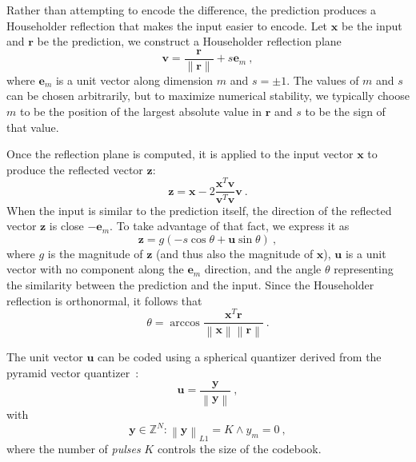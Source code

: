 \documentclass[english,conference,10pt]{IEEEtran}
\begin{document}
Rather than attempting to encode the difference, the prediction produces
a Householder reflection that makes the input easier to encode. Let 
$\mathbf{x}$ be the input and $\mathbf{r}$ be the prediction, we construct
 a Householder reflection plane
\begin{equation}
\mathbf{v} = \frac{\mathbf{r}}{\|\mathbf{r}\|} + s\mathbf{e}_m\ ,
\end{equation}
where $\mathbf{e}_m$ is a unit vector along dimension $m$ and $s = \pm1$.
The values of $m$ and $s$ can be chosen arbitrarily, but to maximize
numerical stability, we typically choose $m$ to be the position of the
largest absolute value in $\mathbf{r}$ and $s$ to be the sign of that value.

Once the reflection plane is computed, it is applied to the input vector
$\mathbf{x}$ to produce the reflected vector $\mathbf{z}$:
\begin{equation}
\mathbf{z} = \mathbf{x} - 2\frac{\mathbf{x}^T\mathbf{v}}
{\mathbf{v}^T\mathbf{v}}\mathbf{v}\ .
\end{equation}
When the input is similar to the prediction itself, the direction of the
reflected vector $\mathbf{z}$ is close $-\mathbf{e}_m$. To take advantage of
that fact, we express it as
\begin{equation}
\mathbf{z} = g\left(-s\cos\theta + \mathbf{u}\sin\theta\right)\ ,
\end{equation}
where $g$ is the magnitude of $\mathbf{z}$ (and thus also the magnitude of
$\mathbf{x}$), $\mathbf{u}$ is a unit vector with no component along the
$\mathbf{e}_m$ direction, and the angle $\theta$ representing the
similarity between the prediction and the input. Since the Householder
reflection is orthonormal, it follows that
\begin{equation}
\theta = \arccos\frac{\mathbf{x}^T\mathbf{r}}
                   {\left\|\mathbf{x}\right\|\left\|\mathbf{r}\right\|}\ .
\end{equation}

The unit vector $\mathbf{u}$ can be coded using a spherical quantizer derived
from the pyramid vector quantizer~\cite{Fischer1986}:
\begin{equation}
\mathbf{u}=\frac{\mathbf{y}}{\left\|\mathbf{y}\right\|}\ ,
\end{equation}
with
\begin{equation}
\mathbf{y} \in \mathbb{Z}^N : \left\|\mathbf{y}\right\|_{L1} = K \land y_m=0\ ,
\end{equation}
where the number of \textit{pulses} $K$ controls the size of the codebook.
\end{document}
